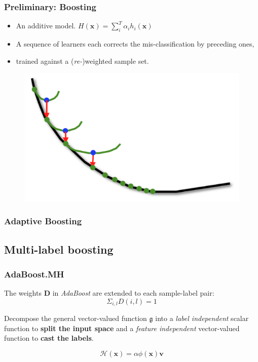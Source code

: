 \documentclass{beamer}
\begin{document}
\begin{frame}
\frametitle{Preliminary: Boosting}
\begin{itemize}
\item An additive model. $H(\mathbf{x}) = \sum_i^T \alpha_i h_i(\mathbf{x})$
\item A sequence of learners each corrects the mis-classification by preceding ones,
\item trained against a (\textit{re-})weighted sample set.
\end{itemize}

\begin{figure}
\includegraphics[width=.5\linewidth]{img/boosting.png}
\end{figure}
\end{frame}

\begin{frame}
\frametitle{Adaptive Boosting}

\begin{algorithm}[H]
\end{algorithm}

\end{frame}

\subsection{Multi-label boosting}

\begin{frame}
\frametitle{AdaBoost.MH}

The weights $\mathbf{D}$ in \textit{AdaBoost} are extended to each sample-label pair:
$${\Sigma}_{i,l} D(i, l) = 1$$


  Decompose the general vector-valued function $\mathfrak{g}$ into a \textit{label independent} scalar function to \textbf{split the input space} and a \textit{feature independent} vector-valued function to \textbf{cast the labels}.

$$\mathcal{H}(\mathbf{x}) = \alpha  \phi(\mathbf{x}) \mathbf{v}$$

\end{frame}
\end{document}
